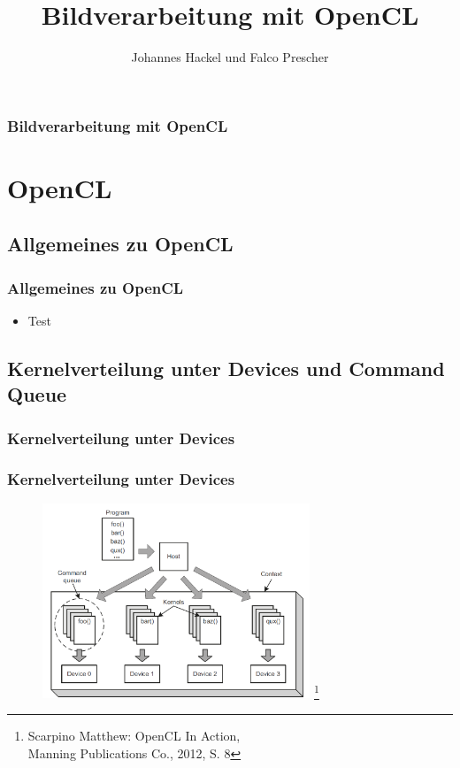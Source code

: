 \documentclass{beamer}
\author{Johannes Hackel und Falco Prescher}
\title{Bildverarbeitung mit OpenCL}
\begin{document}
\begin{frame}
\titlepage
\end{frame}

\begin{frame}
\frametitle{Bildverarbeitung mit OpenCL}
\tableofcontents
\end{frame}

\section{OpenCL}

\subsection{Allgemeines zu OpenCL}
\begin{frame}
\frametitle{Allgemeines zu OpenCL}
\begin{itemize}
\item Test
\end{itemize}
\end{frame}

\subsection{Kernelverteilung unter Devices und Command Queue}

\subsubsection*{Kernelverteilung unter Devices}
\begin{frame}
\frametitle{Kernelverteilung unter Devices}
\begin{figure}
\begin{center}
\includegraphics[width=8cm]{kernel_distr_manning_p8.PNG}
\footnote{\tiny{Scarpino Matthew: OpenCL In Action, \\Manning Publications Co., 2012, S. 8}}
\end{center}
\end{figure}
\end{frame}
\end{document}
